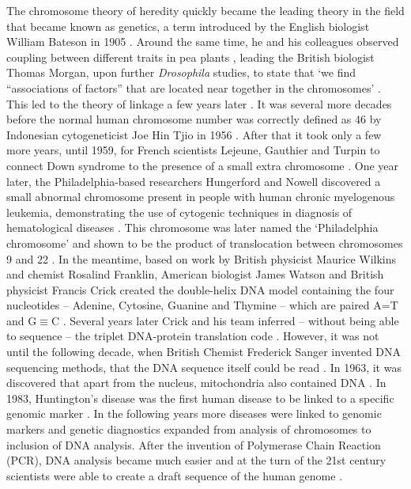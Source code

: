 The chromosome theory of heredity quickly became the leading theory in the field that became known as genetics, a term introduced by the English biologist William Bateson in 1905 \cite{Keynes_2008}. 
Around the same time, he and his colleagues observed coupling between different traits in pea plants \cite{Bateson_1906,Lobo_2008}, leading the British biologist Thomas Morgan, upon further \textsl{Drosophila} studies, to state that ‘we find “associations of factors” that are located near together in the chromosomes’ \cite{Morgan_1911}. 
This led to the theory of linkage a few years later \cite{Morgan_1915}. 
It was several more decades before the normal human chromosome number was correctly defined as 46 by Indonesian cytogeneticist Joe Hin Tjio in 1956 \cite{Tjio_1956}. 
After that it took only a few more years, until 1959, for French scientists Lejeune, Gauthier and Turpin to connect Down syndrome to the presence of a small extra chromosome \cite{Lejeune_1959}.
One year later, the Philadelphia-based researchers Hungerford and Nowell discovered a small abnormal chromosome present in people with human chronic myelogenous leukemia, demonstrating the use of cytogenic techniques in diagnosis of hematological diseases \cite{Nowell_1960}. 
This chromosome was later named the ‘Philadelphia chromosome’ and shown to be the product of translocation between chromosomes 9 and 22 \cite{Rowley_1973}.
In the meantime, based on work by British physicist Maurice Wilkins and chemist Rosalind Franklin, American biologist James Watson and British physicist Francis Crick created the double-helix DNA model containing the four nucleotides – Adenine, Cytosine, Guanine and Thymine – which are paired A=T and G$\equiv$C \cite{Watson_1953,Wilkins_1953,Franklin_1953}. 
Several years later Crick and his team inferred – without being able to sequence – the triplet DNA-protein translation code \cite{Crick_1961,Yanofsky_2007}. 
However, it was not until the following decade, when British Chemist Frederick Sanger invented DNA sequencing methods, that the DNA sequence itself could be read \cite{Sanger_1975,Sanger_1977}. 
In 1963, it was discovered that apart from the nucleus, mitochondria also contained DNA \cite{Nass_1963}. 
In 1983, Huntington’s disease was the first human disease to be linked to a specific genomic marker \cite{Gusella_1983}. 
In the following years more diseases were linked to genomic markers and genetic diagnostics expanded from analysis of chromosomes to inclusion of DNA analysis. 
After the invention of Polymerase Chain Reaction (PCR), DNA analysis became much easier \cite{Saiki_1985,Saiki_1988} and at the turn of the 21st century scientists were able to create a draft sequence of the human genome \cite{Lander_2001,Venter_2001}. 

